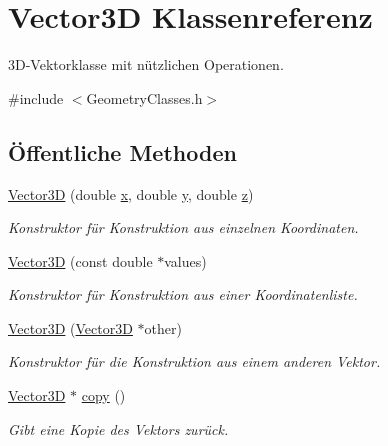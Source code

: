 \hypertarget{classVector3D}{\section{Vector3\-D Klassenreferenz}
\label{classVector3D}
}


3\-D-\/\-Vektorklasse mit nützlichen Operationen.  




{\ttfamily \#include $<$Geometry\-Classes.\-h$>$}

\subsection*{Öffentliche Methoden}
\begin{DoxyCompactItemize}
\item 
\hyperlink{classVector3D_abd851542da40b1168edcad11fa83b7c2}{Vector3\-D} (double \hyperlink{particle__sim_2ParticleSystem_8h_a4877d316febdb87e52d19e4382a938fc}{x}, double \hyperlink{particle__sim_2ParticleSystem_8h_ae666164f442d79adbc300fbb5460377e}{y}, double \hyperlink{particle__sim_2ParticleSystem_8h_ad60e6e73dfb663d917feb7ea4b95eab8}{z})
\begin{DoxyCompactList}\small\item\em Konstruktor für Konstruktion aus einzelnen Koordinaten. \end{DoxyCompactList}\item 
\hyperlink{classVector3D_abd023faf726edb3919c84fd8329a1f8f}{Vector3\-D} (const double $\ast$values)
\begin{DoxyCompactList}\small\item\em Konstruktor für Konstruktion aus einer Koordinatenliste. \end{DoxyCompactList}\item 
\hyperlink{classVector3D_a010bd55f41a082eccb1a7f513db29e69}{Vector3\-D} (\hyperlink{classVector3D}{Vector3\-D} $\ast$other)
\begin{DoxyCompactList}\small\item\em Konstruktor für die Konstruktion aus einem anderen Vektor. \end{DoxyCompactList}\item 
\hyperlink{classVector3D}{Vector3\-D} $\ast$ \hyperlink{classVector3D_a46dd0d9a849809a3857783102959e788}{copy} ()
\begin{DoxyCompactList}\small\item\em Gibt eine Kopie des Vektors zurück. \end{DoxyCompactList}\item 

\end{DoxyCompactItemize}
